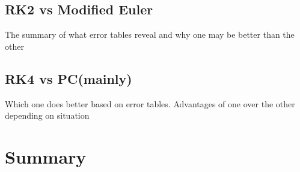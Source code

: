 \documentclass[11pt]{article}	%
\begin{document}
\subsection{RK2 vs Modified Euler}
The summary of what error tables reveal and why one may be better than the other

\subsection{RK4 vs PC(mainly)}
Which one does better based on error tables. Advantages of one over
the other depending on situation 


\section{Summary}



\end{document}
